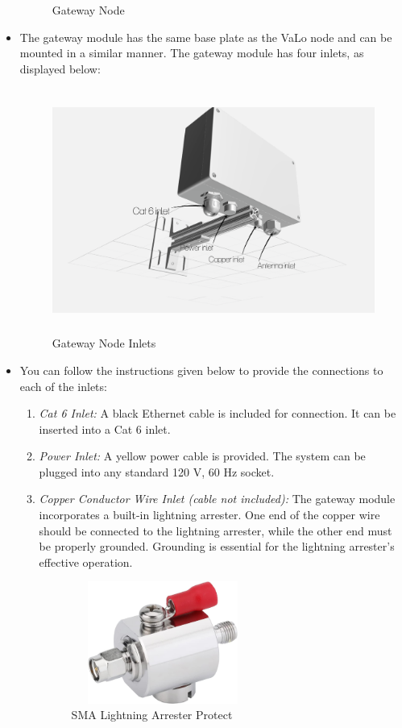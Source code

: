 \documentclass[12pt]{article}
\begin{document}
\begin{itemize}
\begin{figure}[H]
         \centering
        \caption{Gateway Node}\label{Fig:Gateway Node}
    \end{figure}
    \item The gateway module has the same base plate as the VaLo node and can be mounted in a similar manner. The gateway module has four inlets, as displayed below: 
    \begin{figure}[H]
         \centering
         \includegraphics[width=12cm,height=8cm,]{figures/gateway_2.png}
         \centering
        \caption{Gateway Node Inlets}\label{Fig:Gateway Node Inlets}
    \end{figure}
\item You can follow the instructions given below to provide the connections to each of the inlets:
    \begin{enumerate}
        \item \textit{Cat 6 Inlet:} A black Ethernet cable is included for connection. It can be inserted into a Cat 6 inlet.
        \item  \textit{Power Inlet:} A yellow power cable is provided. The system can be plugged into any standard 120 V, 60 Hz socket.
        \item  \textit{Copper Conductor Wire Inlet (cable not included):} The gateway module incorporates a built-in lightning arrester. One end of the copper wire should be connected to the lightning arrester, while the other end must be properly grounded. Grounding is essential for the lightning arrester's effective operation.
                \begin{figure}[H]
             \centering
             \includegraphics[width=6cm,height=4cm,]{figures/lightning_protection.jpg}
             \centering
            \caption{SMA Lightning Arrester Protect}\label{Fig:SMA Lightning Arrester Protect}
        \end{figure}
        

\end{enumerate}
\end{itemize}
\end{document}
